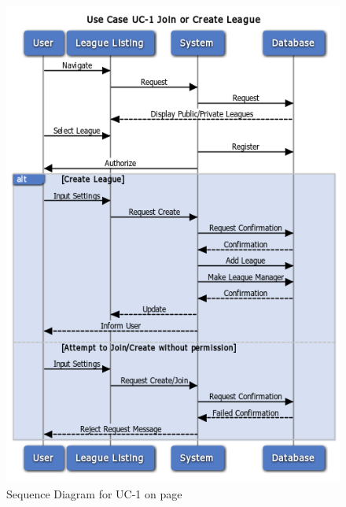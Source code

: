 \begin{figure}
\centering
\includegraphics[width=5.5in]{./Diagrams/SystemSequenceDiagrams/uc1.png}
\caption{Sequence Diagram for UC-1 on page \pageref{UC-1}}
\end{figure}

